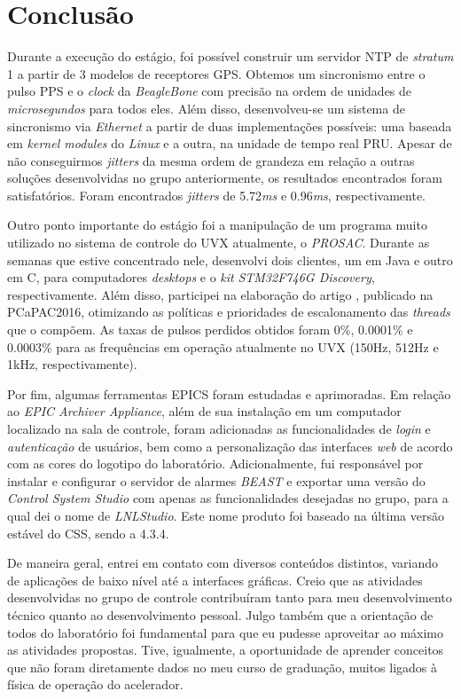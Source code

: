 \section{Conclusão}

Durante a execução do estágio, foi possível construir um servidor NTP de
\textit{stratum} 1 a partir de 3 modelos de receptores GPS. Obtemos um
sincronismo entre o pulso PPS e o \textit{clock} da \textit{BeagleBone} com
precisão na ordem de unidades de \textit{microsegundos} para todos eles. Além
disso, desenvolveu-se um sistema de sincronismo via \textit{Ethernet} a partir
de duas implementações possíveis: uma baseada em \textit{kernel modules} do
\textit{Linux} e a outra, na unidade de tempo real PRU. Apesar de não
conseguirmos \textit{jitters} da mesma ordem de grandeza em relação a outras soluções
desenvolvidas no grupo anteriormente, os resultados encontrados foram
satisfatórios. Foram encontrados \textit{jitters} de 5.72\textit{ms} e
0.96\textit{ms}, respectivamente.

\vspace{12pt}

Outro ponto importante do estágio foi a manipulação de um programa muito
utilizado no sistema de controle do UVX atualmente, o \textit{PROSAC}. Durante
as semanas que estive concentrado nele, desenvolvi dois clientes, um em Java e
outro em C, para computadores \textit{desktops} e o \textit{kit}
\textit{STM32F746G Discovery}, respectivamente. Além disso, participei na
elaboração do artigo \cite{pcapac2016}, publicado na PCaPAC2016, otimizando as
políticas e prioridades de escalonamento das \textit{threads} que o compõem. As
taxas de pulsos perdidos obtidos foram 0\%, 0.0001\% e 0.0003\% para as
frequências em operação atualmente no UVX (150Hz, 512Hz e 1kHz,
respectivamente).

\vspace{12pt}

Por fim, algumas ferramentas EPICS foram estudadas e aprimoradas. Em relação ao
\textit{EPIC Archiver Appliance}, além de sua instalação em um computador
localizado na sala de controle, foram adicionadas as funcionalidades de
\textit{login} e \textit{autenticação} de usuários, bem como a personalização
das interfaces \textit{web} de acordo com as cores do logotipo do laboratório.
Adicionalmente, fui responsável por instalar e configurar o servidor de alarmes
\textit{BEAST} e exportar uma versão do \textit{Control System Studio} com
apenas as funcionalidades desejadas no grupo, para a qual dei o nome de
\textit{LNLStudio}. Este nome produto foi baseado na última versão estável do
CSS, sendo a 4.3.4.

\vspace{12pt}

De maneira geral, entrei em contato com diversos conteúdos distintos, variando
de aplicações de baixo nível até a interfaces gráficas. Creio que as atividades
desenvolvidas no grupo de controle  contribuíram tanto para meu desenvolvimento
técnico quanto ao desenvolvimento pessoal. Julgo também que a orientação de
todos do laboratório foi fundamental para que eu pudesse aproveitar ao máximo as
atividades propostas. Tive, igualmente, a oportunidade de aprender conceitos que
não foram diretamente dados no meu curso de graduação, muitos ligados à física
de operação do acelerador.
 